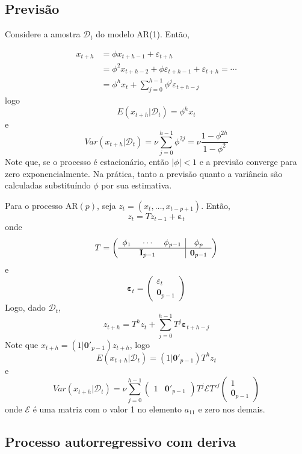 \documentclass[
  letterpaper,
  DIV=11,
  numbers=noendperiod]{scrartcl}
\theoremstyle{plain}
\theoremstyle{plain}
\theoremstyle{definition}
\theoremstyle{definition}
\theoremstyle{remark}
\begin{document}
\hypertarget{previsuxe3o-1}{%
\subsection{Previsão}\label{previsuxe3o-1}}

Considere a amostra \(\mathcal{D}_t\) do modelo AR(1). Então,

\[\begin{align}x_{t+h}&=\phi x_{t+h-1}+\varepsilon_{t+h}\\ &=\phi^2x_{t+h-2}+\phi\varepsilon_{t+h-1}+\varepsilon_{t+h}= \cdots\\&=\phi^h x_t+\sum_{j=0}^{h-1}\phi^j\varepsilon_{t+h-j}\end{align}\]
logo \[E(x_{t+h}|\mathcal{D}_t)=\phi^h x_t\] e
\[Var(x_{t+h}|\mathcal{D}_t)=\nu\sum_{j=0}^{h-1}\phi^{2j}=\nu\frac{1-\phi^{2h}}{1-\phi^2}\]
Note que, se o processo é estacionário, então \(|\phi|<1\) e a previsão
converge para zero exponencialmente. Na prática, tanto a previsão quanto
a variância são calculadas substituíndo \(\phi\) por sua estimativa.

Para o processo AR\((p)\), seja \(z_t=(x_t,\ldots,x_{t-p+1})\). Então,
\[z_t=Tz_{t-1}+\boldsymbol{\varepsilon}_t\] onde
\[T=\left(\begin{array}{ccc|c}\phi_1&\cdots&\phi_{p-1} & \phi_p \\ \hline & \textbf{I}_{p-1} & & \textbf{0}_{p-1}\end{array}\right)\]
e
\[\boldsymbol{\varepsilon}_t=\left(\begin{array}{c}\varepsilon_t \\ \hline \textbf{0}_{p-1}\end{array}\right)\]
Logo, dado \(\mathcal{D}_t\),
\[z_{t+h}=T^h z_t+\sum_{j=0}^{h-1}T^j\boldsymbol{\varepsilon}_{t+h-j}\]
Note que \(x_{t+h}=(1|\textbf{0}'_{p-1})z_{t+h}\), logo
\[E(x_{t+h}|\mathcal{D}_t)=(1|\textbf{0}'_{p-1})T^h z_t\] e
\[Var(x_{t+h}|\mathcal{D}_t)=\nu\sum_{j=0}^{h-1}\left(\begin{array}{c|c}1&\textbf{0}'_{p-1}\end{array}\right)T^j \mathcal{E} T'^j\left(\begin{array}{c}1 \\ \hline \textbf{0}_{p-1}\end{array}\right) \]
onde \(\mathcal{E}\) é uma matriz com o valor 1 no elemento \(a_{11}\) e
zero nos demais.

\hypertarget{processo-autorregressivo-com-deriva}{%
\subsection{Processo autorregressivo com
deriva}\label{processo-autorregressivo-com-deriva}}
\end{document}

